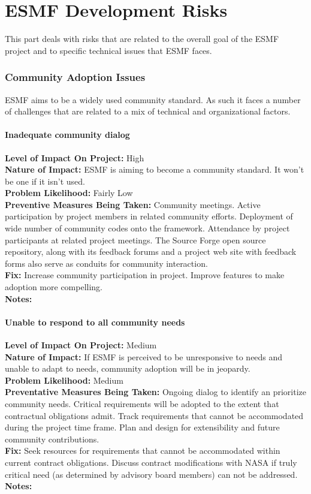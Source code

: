 \documentclass[english]{article}
\newcommand{\req}[1]{\section{\hspace{.2in}#1}}
\newcommand{\sreq}[1]{\subsection{\hspace{.2in}#1}}
\newenvironment
{reqlist}
{\begin{list} {} {} \rm \item[]}
{\end{list}}
\newcommand{\shortname}{RSK}
\begin{document}
\newpage

\part{ESMF Development Risks}

This part deals with risks that are related to the overall goal of the ESMF project and
to specific technical issues that ESMF faces.

\setcounter{section}{0}
\renewcommand{\thesection}{\shortname\arabic{section}}
\renewcommand{\thesubsection}{\shortname\arabic{section}.\arabic{subsection}}
\renewcommand{\thesubsubsection}{\shortname\arabic{section}.\arabic{subsection}.\arabic{subsubsection}}

\req{Community Adoption Issues}
ESMF aims to be a widely used community standard. As such it faces a number of challenges that are
related to a mix of technical and organizational factors.
\sreq{Inadequate community dialog}
\begin{reqlist}
{\bf Level of Impact On Project:}  High \\
{\bf Nature of Impact:} ESMF is aiming to become a community standard. It won't be one if it isn't used.\\
{\bf Problem Likelihood:} Fairly Low\\
{\bf Preventive Measures Being Taken:} Community meetings. Active participation by project
members in related community efforts. Deployment of wide number of community codes
onto the framework. Attendance by project participants at related project
meetings. The Source Forge open source repository, along with its feedback forums
and a project web site with feedback forms also serve as conduits for community interaction.\\
{\bf Fix:} Increase community participation in project. Improve features to make
adoption more compelling.\\
{\bf Notes:} \\
\end{reqlist}

\sreq{Unable to respond to all community needs}
\begin{reqlist}
{\bf Level of Impact On Project:}  Medium \\
{\bf Nature of Impact:} If ESMF is perceived to be unresponsive to needs and unable to adapt to needs,
 community adoption will be in jeopardy.\\
{\bf Problem Likelihood:} Medium \\
{\bf Preventative Measures Being Taken:} Ongoing dialog to identify an prioritize
community needs. Critical requirements will be adopted to the extent
that contractual obligations admit. Track requirements that cannot be accommodated during the
project time frame. Plan and design for extensibility and future community contributions.\\
{\bf Fix:} Seek resources for requirements that cannot be accommodated within current
contract obligations. Discuss contract modifications with NASA if truly critical
need (as determined by advisory board members) can not be addressed. \\
{\bf Notes:} \\
\end{reqlist}
\end{document}
